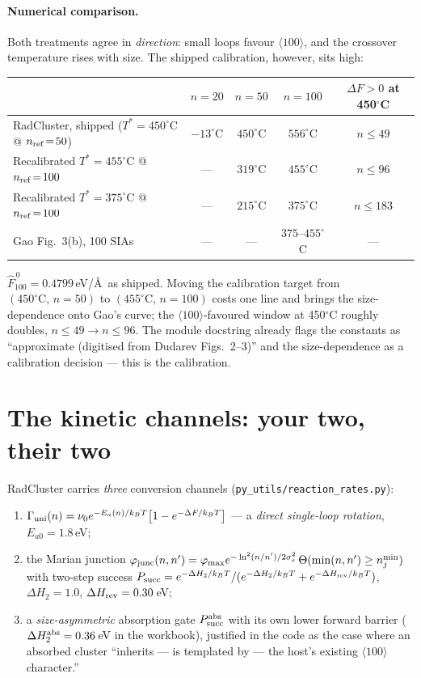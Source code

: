 \documentclass[11pt,a4paper]{article}
\newcommand{\code}[1]{\texttt{\small #1}}
\newcommand{\flag}[1]{\textcolor{red!70!black}{#1}}
\begin{document}
\paragraph{Numerical comparison.} Both treatments agree in \emph{direction}: small loops
favour $\langle100\rangle$, and the crossover temperature rises with size. The shipped
calibration, however, sits high:

\begin{center}\footnotesize\setlength{\tabcolsep}{6pt}
\begin{tabular}{lcccc}
\toprule
& $n=20$ & $n=50$ & $n=100$ & $\Delta F>0$ at 450$^\circ$C \\
\midrule
RadCluster, shipped ($T^*\!=\!450^\circ$C @ $n_{\rm ref}\!=\!50$) & $-13^\circ$C & $450^\circ$C & \flag{$556^\circ$C} & $n\le49$ \\
Recalibrated $T^*\!=\!455^\circ$C @ $n_{\rm ref}\!=\!100$ & --- & $319^\circ$C & $455^\circ$C & $n\le96$ \\
Recalibrated $T^*\!=\!375^\circ$C @ $n_{\rm ref}\!=\!100$ & --- & $215^\circ$C & $375^\circ$C & $n\le183$ \\
\midrule
Gao Fig.~3(b), 100 SIAs & --- & --- & $375$--$455^\circ$C & --- \\
\bottomrule
\end{tabular}
\end{center}

\noindent $\hat F^{\,0}_{100}=0.4799$\,eV/\AA\ as shipped. Moving the calibration target
from $(450^\circ\mathrm{C},\,n\!=\!50)$ to $(455^\circ\mathrm{C},\,n\!=\!100)$ costs one
line and brings the size-dependence onto Gao's curve; the $\langle100\rangle$-favoured
window at 450$^\circ$C roughly doubles, $n\le49\rightarrow n\le96$. The module docstring
already flags the constants as ``approximate (digitised from Dudarev Figs.~2--3)'' and the
size-dependence as a calibration decision --- this is the calibration.

\section{The kinetic channels: your two, their two}

RadCluster carries \emph{three} conversion channels (\code{py\_utils/reaction\_rates.py}):
\begin{enumerate}[leftmargin=*,itemsep=1pt,topsep=2pt]
\item $\Gamma_{\rm uni}(n)=\nu_0e^{-E_a(n)/k_BT}\bigl[1-e^{-\Delta F/k_BT}\bigr]$ --- a
\emph{direct single-loop rotation}, $E_{a0}=1.8$\,eV;
\item the Marian junction $\varphi_{\rm junc}(n,n')=\varphi_{\max}
e^{-\ln^2(n/n')/2\sigma_s^2}\,\Theta(\min(n,n')\ge n_j^{\min})$ with two-step success
$P_{\rm succ}=e^{-\Delta H_2/k_BT}/(e^{-\Delta H_2/k_BT}+e^{-\Delta H_{\rm rev}/k_BT})$,
$\Delta H_2=1.0$, $\Delta H_{\rm rev}=0.30$\,eV;
\item a \emph{size-asymmetric} absorption gate $P^{\rm abs}_{\rm succ}$ with its own lower
forward barrier ($\Delta H_2^{\rm abs}=0.36$\,eV in the workbook), justified in the code as
the case where an absorbed cluster ``inherits --- is templated by --- the host's existing
$\langle100\rangle$ character.''
\end{enumerate}
\end{document}

